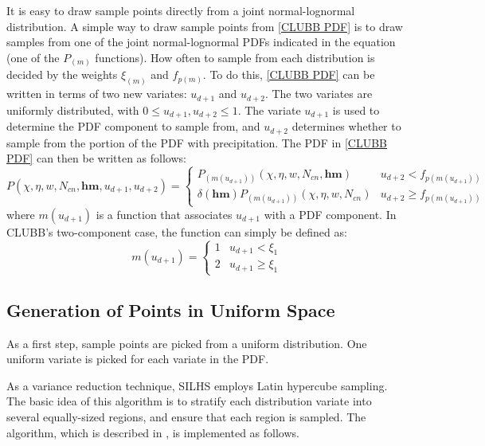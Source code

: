 \documentclass[11pt,fleqn]{article}
\begin{document}
It is easy to draw sample points directly from a joint normal-lognormal
distribution. A simple way to draw sample points from \eqref{CLUBB PDF} is to
draw samples from one of the joint normal-lognormal PDFs indicated in the
equation (one of the $P_{(m)}$ functions). How often to sample from each
distribution is decided by the weights $\xi_{(m)}$ and $f_{p(m)}$. To do this,
\eqref{CLUBB PDF} can be written in terms of two new variates: $u_{d+1}$ and
$u_{d+2}$. The two variates are uniformly distributed, with $0 \le
u_{d+1},u_{d+2} \le 1$. The variate $u_{d+1}$ is used to determine the PDF
component to sample from, and $u_{d+2}$ determines whether to sample from the
portion of the PDF with precipitation. The PDF in \eqref{CLUBB PDF} can then be
written as follows:
\begin{equation}
P(\chi,\eta,w,N_{cn},\mathbf{hm},u_{d+1},u_{d+2}) =
\begin{cases}
P_{(m(u_{d+1}))}(\chi,\eta,w,N_{cn},\mathbf{hm}) & u_{d+2} < f_{p(m(u_{d+1}))}
\\ \delta(\mathbf{hm}) P_{(m(u_{d+1}))}(\chi,\eta,w,N_{cn}) & u_{d+2} \ge
f_{p(m(u_{d+1}))}
\end{cases}
\label{CLUBB PDF with uniform}
\end{equation}
where $m(u_{d+1})$ is a function that associates $u_{d+1}$ with a PDF component.
In CLUBB's two-component case, the function can simply be defined as:
\begin{equation}
m(u_{d+1}) =
\begin{cases}
1 & u_{d+1} < \xi_1 \\
2 & u_{d+1} \ge \xi_1
\end{cases}
\end{equation}

\subsection{Generation of Points in Uniform Space}

As a first step, sample points are picked from a uniform distribution. One
uniform variate is picked for each variate in the PDF.

As a variance reduction technique, SILHS employs Latin hypercube sampling. The
basic idea of this algorithm is to stratify each distribution variate into
several equally-sized regions, and ensure that each region is sampled. The
algorithm, which is described in \citet{larson2005supplying}, is implemented as
follows.
\end{document}

